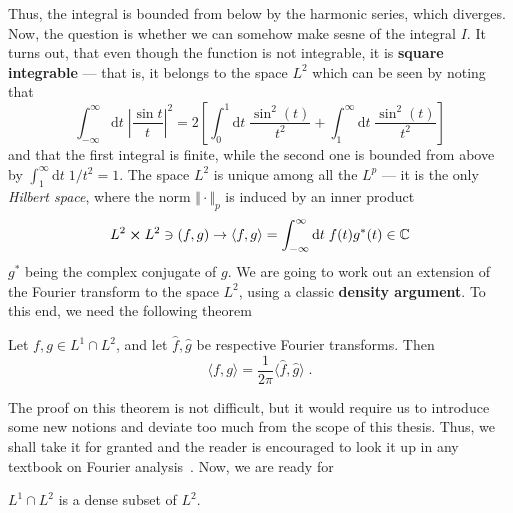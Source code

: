Thus, the integral is bounded from below by the harmonic series, which diverges.
Now, the question is whether we can somehow make sesne of the integral \(I\).
It turns out, that
even though the function is not integrable, it is \textbf{square integrable} --- that is, it belongs to the
space \(L^2\)
which can be seen by noting that
\begin{equation}
    \int_{-\infty }^{\infty} \mathrm{d}t \; \left|\frac{\sin t}t\right|^2  =
    2\left[ \int_{0}^{1} \mathrm{d}t \; \frac{\sin^2(t)}{t^2} + \int_{1}^{\infty } \mathrm{d}t \; \frac{\sin^2(t)}{t^2}   \right]
\end{equation}
and that the first integral is finite, while the second one is bounded from above by \(\int_{1}^{\infty}\mathrm{d}t\;  1/t^2 = 1\).
The space \(L^2\) is unique among all the \(L^p\) --- it is the only \textit{Hilbert space},
where the norm \(\Vert \cdot \Vert_p \) is induced by an inner product
\begin{equation}
    L^2 \cross L^2 \ni (f,g) \to \langle f,g \rangle = \int_{-\infty}^{\infty} \mathrm{d}t \; f(t)g^*(t) \in \mathbb{C}
\end{equation}
\(g^*\) being the complex conjugate of \(g\). We are going to work out an extension of the Fourier transform
to the space \(L^2\), using a classic \textbf{density argument}. To this end, we need the following theorem
\begin{theorem}

    Let \(f,g \in L^1 \cap L^2\), and let \(\hat{f},\hat{g}\) be respective Fourier transforms. Then
    \begin{equation*}
        \langle f,g \rangle = \frac{1}{2\pi }\langle \hat{f} ,\hat{g}  \rangle  \; .
    \end{equation*}
\end{theorem}
The proof on this theorem is not difficult, but it would require us to introduce some new notions and deviate
too much from the scope of this thesis. Thus, we shall take it for granted and the reader is encouraged to
look it up in any textbook on Fourier analysis~\autocite{Rudin1987,Stein2011}. Now, we are ready for
\begin{theorem}
    \(L^1 \cap L^2\) is a dense subset of \(L^2\).
\end{theorem}

